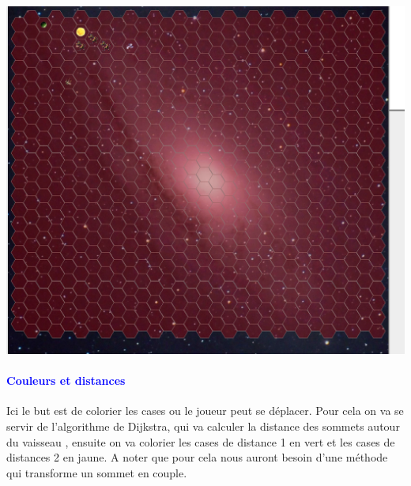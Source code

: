 \documentclass{report}
\begin{document}
      \begin{center}  
          \includegraphics[scale=0.30]{Images/effaceColoration.png}
      \end{center} 
       
       
      \paragraph{\textcolor{blue} {Couleurs et distances}} 
      Ici le but est de colorier les cases ou le joueur peut se déplacer. 
      Pour cela on va  se servir de l'algorithme de Dijkstra, qui va calculer la distance des sommets autour du vaisseau , ensuite on va colorier les cases de distance 1 en vert et les cases de distances 2 en jaune. A noter que pour cela nous auront besoin d'une méthode qui transforme un sommet en couple. 
       
         
       
      
\end{document}
